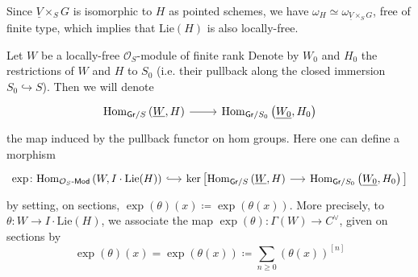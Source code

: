 \begin{rem}[]
	Since $\underline{V} \times_{ S } G$ is isomorphic to $H$ as pointed
	schemes, we have $\omega_H \simeq \omega_{\underline{V} \times_S G}$, free of finite type,
	which implies that $\mathrm{Lie}(H)$ is also locally-free.
\end{rem}


\begin{defn}
	Let $W$ be a locally-free $\mathcal{O}_{ S }$-module of finite rank
	Denote by $W_0$ and $H_0$ the restrictions of $W$ and $H$ to 
	$S_0$ (i.e. their pullback along
	the closed immersion $S_0 \hookrightarrow S$).
	Then we will denote
	\begin{equation*}
	\begin{tikzcd}[row sep = 0ex
		,/tikz/column 1/.append style={anchor=base east}
		,/tikz/column 2/.append style={anchor=base west}]
		\mathrm{Hom}_{ \mathsf{Gr}/S } 
		\left( \underline{W}, H \right)
		\arrow[r, "", rightarrow] &
		\mathrm{Hom}_{ \mathsf{Gr}/S_0 }
		\left( \underline{W_0}, H_0 \right)
	\end{tikzcd}
	\end{equation*} 
	the map induced by the pullback functor on hom groups.
	Here one can define a morphism
	\begin{equation*}
	\begin{tikzcd}[row sep = 0ex, column sep = 1.39em
		,/tikz/column 1/.append style={anchor=base east}
		,/tikz/column 2/.append style={anchor=base west}]
		\exp\colon
		\mathrm{Hom}_{ \mathcal{O}_{ S }\text{-}\mathsf{Mod} }
		\left( W, I \cdot \mathrm{Lie}(H) \right)
		\arrow[r, "", hookrightarrow] &
		\ker \big[ 
		\mathrm{Hom}_{ \mathsf{Gr}/S } 
		\left( \underline{W}, H \right)
		\arrow[r, "", rightarrow] &
		\mathrm{Hom}_{ \mathsf{Gr}/S_0 }
		\left( \underline{W_0}, H_0 \right)
		\big]
	\end{tikzcd}
	\end{equation*} 
	by setting, on sections,
	$\exp (\theta) (x) \coloneqq \exp \left( \theta(x) \right)$.
	More precisely, to $\theta\colon W \to I \cdot \mathrm{Lie}(H)$,
	we associate the map $\exp (\theta)\colon \Gamma(W) \to C^\vee$, given on sections by
	\begin{equation*}
		\exp (\theta) (x) =
	\exp \left( \theta(x) \right) \coloneqq
	\sum_{n\geq 0 } (\theta(x))^{[n]}

\end{equation*}
\end{defn}
